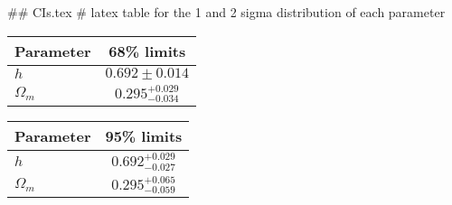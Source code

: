 ## CIs.tex
# latex table for the 1 and 2 sigma distribution of each parameter

\begin{tabular} { l  c}
 Parameter &  68\% limits\\
\hline
{\boldmath$h              $} & $0.692\pm 0.014            $\\
{\boldmath$\Omega_m       $} & $0.295^{+0.029}_{-0.034}   $\\
\hline
\end{tabular}

\begin{tabular} { l  c}
 Parameter &  95\% limits\\
\hline
{\boldmath$h              $} & $0.692^{+0.029}_{-0.027}   $\\
{\boldmath$\Omega_m       $} & $0.295^{+0.065}_{-0.059}   $\\
\hline
\end{tabular}
